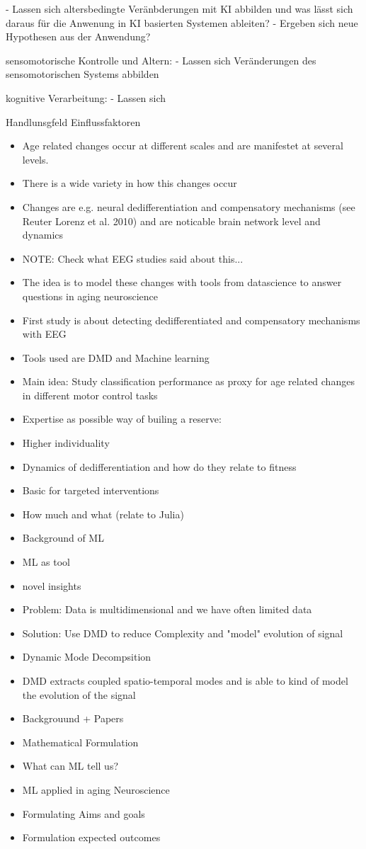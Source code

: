 - Lassen sich altersbedingte Veränbderungen mit KI abbilden und was lässt sich daraus für die Anwenung in KI basierten Systemen ableiten? 
- Ergeben sich neue Hypothesen aus der Anwendung? 


sensomotorische Kontrolle und Altern: 
- Lassen sich Veränderungen des sensomotorischen Systems abbilden 

kognitive Verarbeitung: 
- Lassen sich 

Handlunsgfeld Einflussfaktoren 




\begin{itemize}
    \item Age related changes occur at different scales and are manifestet at several levels.
    \item There is a wide variety in how this changes occur
    \item Changes are e.g. neural dedifferentiation and compensatory mechanisms (see Reuter Lorenz et al. 2010) and are noticable brain network level and dynamics
    \item NOTE: Check what EEG studies said about this...
    \item The idea is to model these changes with tools from datascience to answer questions in aging neuroscience
    \item First study is about detecting dedifferentiated and compensatory mechanisms with EEG
    \item Tools used are DMD and Machine learning
    \item Main idea: Study classification performance as proxy for age related changes in different motor control tasks
    \item Expertise as possible way of builing a reserve:
    \item Higher individuality 
    \item Dynamics of dedifferentiation and how do they relate to fitness
    \item Basic for targeted interventions 
    \item How much and what (relate to Julia)
    \item Background of ML
    \item ML as tool 
    \item novel insights 
    \item Problem: Data is multidimensional and we have often limited data 
    \item Solution: Use DMD to reduce Complexity and "model" evolution of signal 
    \item Dynamic Mode Decompsition
    \item DMD extracts coupled spatio-temporal modes and is able to kind of model the evolution of the signal 
    \item Backgrouund + Papers 
    \item Mathematical Formulation
    \item What can ML tell us?
    \item ML applied in aging Neuroscience
    \item Formulating Aims and goals 
    \item Formulation expected outcomes
\end{itemize}
